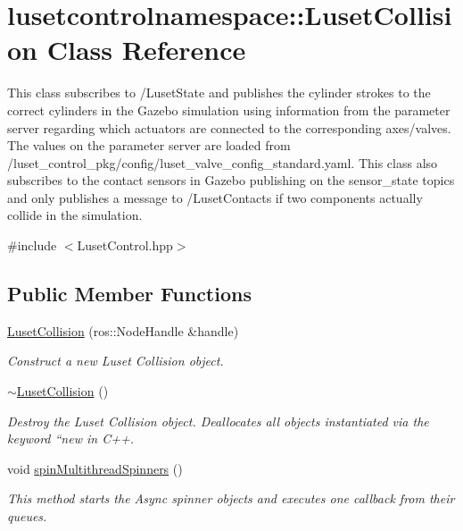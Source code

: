 \hypertarget{classlusetcontrolnamespace_1_1LusetCollision}{}\section{lusetcontrolnamespace\+:\+:Luset\+Collision Class Reference}
\label{classlusetcontrolnamespace_1_1LusetCollision}


This class subscribes to /\+Luset\+State and publishes the cylinder strokes to the correct cylinders in the Gazebo simulation using information from the parameter server regarding which actuators are connected to the corresponding axes/valves. The values on the parameter server are loaded from /luset\+\_\+control\+\_\+pkg/config/luset\+\_\+valve\+\_\+config\+\_\+standard.yaml. This class also subscribes to the contact sensors in Gazebo publishing on the sensor\+\_\+state topics and only publishes a message to /\+Luset\+Contacts if two components actually collide in the simulation.  




{\ttfamily \#include $<$Luset\+Control.\+hpp$>$}

\subsection*{Public Member Functions}
\begin{DoxyCompactItemize}
\item 
\hyperlink{classlusetcontrolnamespace_1_1LusetCollision_ad328e1562126f008d720283d46da46d1}{Luset\+Collision} (ros\+::\+Node\+Handle \&handle)
\begin{DoxyCompactList}\small\item\em Construct a new Luset Collision object. \end{DoxyCompactList}\item 
\hyperlink{classlusetcontrolnamespace_1_1LusetCollision_a4639f920509325c05cc1d27e6008366a}{$\sim$\+Luset\+Collision} ()
\begin{DoxyCompactList}\small\item\em Destroy the Luset Collision object. Deallocates all objects instantiated via the keyword ``new\textquotesingle{}\textquotesingle{} in C++. \end{DoxyCompactList}\item 
void \hyperlink{classlusetcontrolnamespace_1_1LusetCollision_a035907cd6d2820811a87c1f7945df287}{spin\+Multithread\+Spinners} ()
\begin{DoxyCompactList}\small\item\em This method starts the Async spinner objects and executes one callback from their queues. \end{DoxyCompactList}\end{DoxyCompactItemize}
